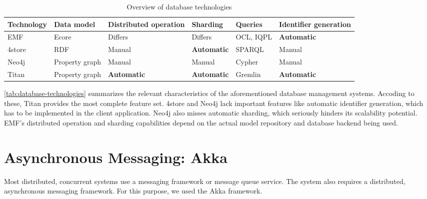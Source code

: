 \begin{table}[htb]

\centering
\begin{tabular}{ | l | l | m{2cm} | l | l | m{2cm} | }

\hline
\bf Technology & 
\bf Data model & 
\bf Distributed operation  & 
\bf Sharding   & 
\bf Queries    & 
\bf Identifier generation \tabularnewline \hline\hline
EMF     & Ecore           & Differs             & Differs             & OCL, IQPL & \textbf{Automatic}  \\ \hline
4store  & RDF             & Manual              & \textbf{Automatic}  & SPARQL    & Manual              \\ \hline
Neo4j   & Property graph  & Manual              & Manual              & Cypher    & Manual              \\ \hline
Titan   & Property graph  & \textbf{Automatic}  & \textbf{Automatic}  & Gremlin   & \textbf{Automatic}  \\ \hline

\end{tabular}
\caption{Overview of database technologies}
\label{tab:database-technologies}

\end{table}

\autoref{tab:database-technologies} summarizes the relevant characteristics of the aforementioned database management systems. Accoding to these, Titan provides the most complete feature set. 4store and Neo4j lack important features like automatic identifier generation, which has to be implemented in the client application. Neo4j also misses automatic sharding, which seriously hinders its scalability potential. EMF's distributed operation and sharding capabilities depend on the actual model repository and database backend being used. 


\section{Asynchronous Messaging: Akka}
\label{akka}

Most distributed, concurrent systems use a messaging framework or message queue service. %
The \iqd{} system also requires a distributed, asynchronous messaging framework. For this purpose, we used the Akka framework.

